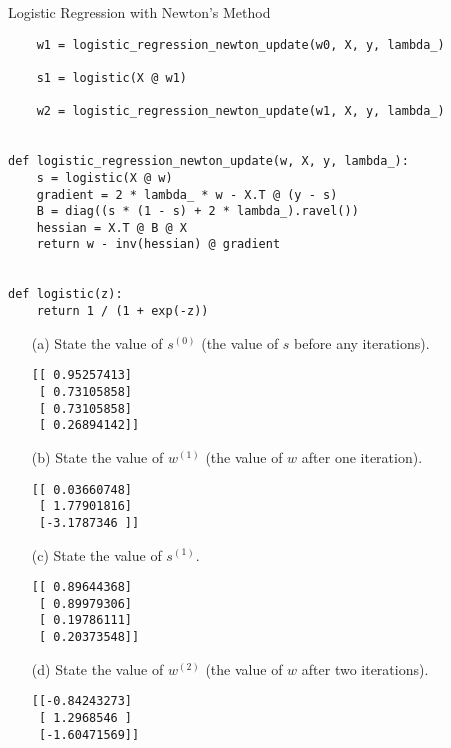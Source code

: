 \documentclass[section]{problemset}
\begin{document}
\begin{problem}{Logistic Regression with Newton's Method}
\begin{enumerate}
\begin{mdframed}
\begin{verbatim}
    w1 = logistic_regression_newton_update(w0, X, y, lambda_)

    s1 = logistic(X @ w1)

    w2 = logistic_regression_newton_update(w1, X, y, lambda_)


def logistic_regression_newton_update(w, X, y, lambda_):
    s = logistic(X @ w)
    gradient = 2 * lambda_ * w - X.T @ (y - s)
    B = diag((s * (1 - s) + 2 * lambda_).ravel())
    hessian = X.T @ B @ X
    return w - inv(hessian) @ gradient


def logistic(z):
    return 1 / (1 + exp(-z))
  \end{verbatim}
\end{mdframed}

\begin{itemize}
\item[(a)]
State the value of $s^{(0)}$ (the value of $s$ before any iterations).

\begin{mdframed}
\begin{verbatim}
[[ 0.95257413]
 [ 0.73105858]
 [ 0.73105858]
 [ 0.26894142]]
\end{verbatim}
\end{mdframed}


\item[(b)]
State the value of $w^{(1)}$ (the value of $w$ after one iteration).
\begin{mdframed}
\begin{verbatim}
[[ 0.03660748]
 [ 1.77901816]
 [-3.1787346 ]]
\end{verbatim}
\end{mdframed}


\item[(c)]
State the value of $s^{(1)}$.
\begin{mdframed}
\begin{verbatim}
[[ 0.89644368]
 [ 0.89979306]
 [ 0.19786111]
 [ 0.20373548]]
\end{verbatim}
\end{mdframed}


\item[(d)]
State the value of $w^{(2)}$ (the value of $w$ after two iterations).
\begin{mdframed}
\begin{verbatim}
[[-0.84243273]
 [ 1.2968546 ]
 [-1.60471569]]
\end{verbatim}
\end{mdframed}

\end{itemize}
\end{enumerate}
\end{problem}
\end{document}
